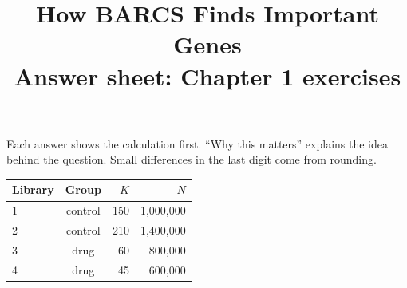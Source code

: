 \documentclass[12pt]{article}
\title{\textbf{How BARCS Finds Important Genes}\\[6pt]
\Large Answer sheet: Chapter 1 exercises}
\author{\guideauthor}
\date{\guidedate}
\begin{document}
\maketitle
\thispagestyle{empty}

Each answer shows the calculation first. ``Why this matters'' explains the
idea behind the question. Small differences in the last digit come from
rounding.

\begin{center}
\small
\begin{tabular}{lcrr}
\toprule
Library & Group & $K$ & $N$\\
\midrule
1 & control & 150 & 1{,}000{,}000\\
2 & control & 210 & 1{,}400{,}000\\
3 & drug    &  60 &   800{,}000\\
4 & drug    &  45 &   600{,}000\\
\bottomrule
\end{tabular}
\end{center}
\end{document}

